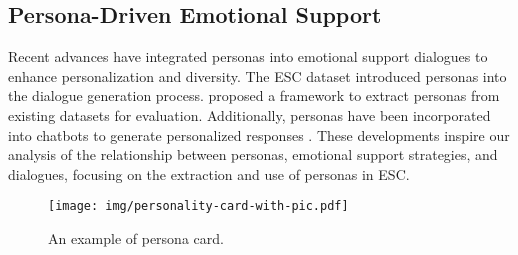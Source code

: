 \subsection{Persona-Driven Emotional Support}
Recent advances have integrated personas into emotional support dialogues to enhance personalization and diversity. The ESC dataset \citep{zhang2024escot} introduced personas into the dialogue generation process. \citep{zhao2024esc} proposed a framework to extract personas from existing datasets for evaluation. Additionally, personas have been incorporated into chatbots to generate personalized responses \citep{tu2023characterchat, ait2023power, ma2024personality}.
These developments inspire our analysis of the relationship between personas, emotional support strategies, and dialogues, focusing on the extraction and use of personas in ESC.


\begin{figure}
\setlength{\abovecaptionskip}{5pt}   
\setlength{\belowcaptionskip}{0pt}
    \centering
    \texttt{[image: img/personality-card-with-pic.pdf]}
    \caption{An example of persona card.}
    \label{fig:card-img}
    \vspace{-0.3cm}
\end{figure}